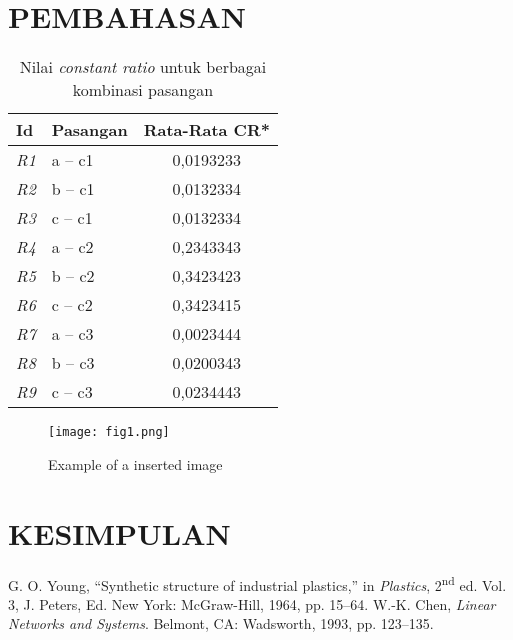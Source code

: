 \documentclass[12pt,a4paper]{article}
\begin{document}
\begin{multicols}{2}
\section{PEMBAHASAN}
\begin{table}[H]
  \centering
  \caption{Nilai \textit{constant ratio} untuk berbagai kombinasi pasangan}
  \label{tab:cr}
  \begin{tabular}{l l c}
  \toprule
  \textbf{Id} & \textbf{Pasangan} & \textbf{Rata-Rata CR*} \\
  \midrule
  \textit{R1} & a -- c1 & 0,0193233 \\
  \textit{R2} & b -- c1 & 0,0132334 \\
  \textit{R3} & c -- c1 & 0,0132334 \\
  \textit{R4} & a -- c2 & 0,2343343 \\
  \textit{R5} & b -- c2 & 0,3423423 \\
  \textit{R6} & c -- c2 & 0,3423415 \\
  \textit{R7} & a -- c3 & 0,0023444 \\
  \textit{R8} & b -- c3 & 0,0200343 \\
  \textit{R9} & c -- c3 & 0,0234443 \\
  \bottomrule
  \end{tabular}
  \end{table}
\lipsum
\begin{figure}[H]
  \centering
  \texttt{[image: fig1.png]}
  \caption{Example of a inserted image}
  \label{fig:example}
\end{figure}
\section{KESIMPULAN}
\lipsum
\printbibliography[heading=bibliography]

\begin{thebibliography}{99}
G. O. Young, ``Synthetic structure of industrial plastics,'' in \textit{Plastics}, 2\textsuperscript{nd} ed. Vol. 3, J. Peters, Ed. New York: McGraw-Hill, 1964, pp. 15--64.
W.-K. Chen, \textit{Linear Networks and Systems}. Belmont, CA: Wadsworth, 1993, pp. 123--135.
\end{thebibliography}

\end{multicols}
\end{document}
